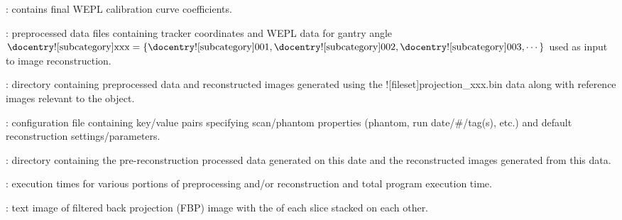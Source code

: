 \begin{tcbenvironment}
\begin{tcbparagraph}
\begin{ThinEnum}
\begin{ThinEnum}
\begin{ThinEnum}
\begin{ThinEnum}
\begin{ThinEnum}
\begin{ThinEnum}
\begin{ThinEnum}
                                	\item {} : contains final WEPL calibration curve coefficients.
						\item {} : preprocessed data files containing tracker coordinates and WEPL data for gantry angle $\text{\docentry![subcategory]{xxx}} =\{\text{\docentry![subcategory]{001}}, \text{\docentry![subcategory]{002}}, \text{\docentry![subcategory]{003}}, \cdots\}$ used as input to image reconstruction.
                               \item {} : directory containing preprocessed data and reconstructed images generated using the \docentry![fileset]{projection\_xxx.bin} data along with reference images relevant to the object.
                               \begin{ThinEnum}
                                    \item {} : configuration file containing key/value pairs specifying scan/phantom properties
                                    (phantom, run date/\#/tag(s), etc.) and default reconstruction settings/parameters.
                    				\item {} : directory containing the pre-reconstruction processed data generated on this date and the reconstructed images generated from this data.
                                    \begin{ThinEnum}
                                        	\item {} : execution times for various portions of preprocessing and/or reconstruction and total program execution time.
                                        	\item {} : text image of filtered back projection (FBP) image with the \xyplane* of each slice stacked on each other.
\newpage

\end{ThinEnum}
\end{ThinEnum}
\end{ThinEnum}
\end{ThinEnum}
\end{ThinEnum}
\end{ThinEnum}
\end{ThinEnum}
\end{ThinEnum}
\end{ThinEnum}
\end{tcbparagraph}
\end{tcbenvironment}
